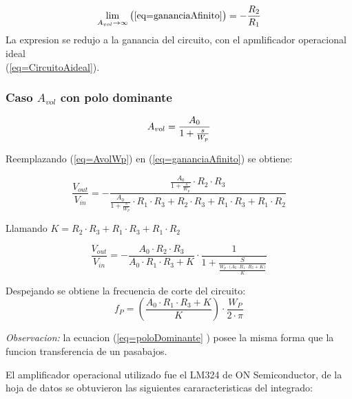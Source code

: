 \documentclass[../../main.tex]{subfiles}
\begin{document}
$$ \lim_{A_{vol}\to\infty} \big( \ref{eq=gananciaAfinito} \big) = -\frac{R_{2}}{R_{1}} $$
La expresion se redujo a la ganancia del circuito, con el apmlificador operacional ideal\\ \big(\ref{eq=CircuitoAideal}\big).

\subsubsection{Caso $A_{vol}$  con polo dominante}

\begin{equation}
A_{vol }=\frac{A_{0}}{1+\frac{s}{W_{p}}}\label{eq=AvolWp}\\
\end{equation} 

Reemplazando \big(\ref{eq=AvolWp}\big) en  \big(\ref{eq=gananciaAfinito}\big)  se obtiene:

\begin{equation}
\frac{V_{out}}{V_{in}}= - \frac{\frac{A_{0}}{1+\frac{s}{W_{p}}} \cdot R_{2} \cdot R_{3}}{\frac{A_{0}}{1+\frac{s}{W_{p}}}\cdot R_{1} \cdot R_{3} + R_{2} \cdot R_{3} +  R_{1} \cdot R_{3} + R_{1} \cdot R_{2} }
\end{equation}

Llamando $K= R_{2} \cdot R_{3} +  R_{1} \cdot R_{3} + R_{1} \cdot R_{2}$


\begin{equation}
\frac{V_{out}}{V_{in}}=- \frac{A_{0} \cdot  R_{2} \cdot  R_{3} }{A_{0} \cdot R_{1} \cdot  R_{3} + K }  \cdot \frac{1}{1 +\frac {S}{\frac{W_{p}  \cdot \big( A_{0} \cdot R_{1} \cdot R_{3} + K \big) }{K}}} \label{eq=poloDominante}
\end{equation}

 Despejando se obtiene la frecuencia de corte del circuito:
\begin{equation}
f_{P}=\left( \frac {A_{0} \cdot R_{1} \cdot R_{3} + K}{K}\right)  \cdot \frac{W_{P}}{2\cdot \pi}  \label{eq=fCorte}
\end{equation}

\textit{Observacion:}  la ecuacion \big(\ref{eq=poloDominante} \big) posee la misma forma que la funcion transferencia de un pasabajos.



El amplificador operacional utilizado fue el LM324 de ON Semiconductor, de la hoja de datos se obtuvieron las siguientes cararacteristicas del integrado:
\end{document}
